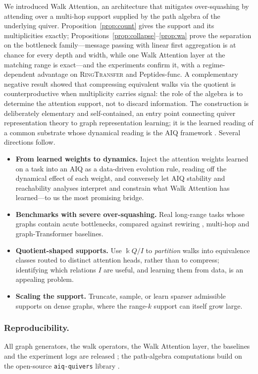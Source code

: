\documentclass[runningheads]{llncs}
\newcommand{\kk}{\Bbbk}
\newcommand{\kQ}{\kk Q}
\begin{document}
We introduced Walk Attention, an architecture that mitigates over-squashing by
attending over a multi-hop support supplied by the path algebra of the
underlying quiver. Proposition~\ref{prop:count} gives the support and its
multiplicities exactly; Propositions~\ref{prop:collapse}--\ref{prop:wa} prove
the separation on the bottleneck family---message passing with linear first
aggregation is at chance for every depth and width, while one Walk Attention
layer at the matching range is exact---and the experiments confirm it, with a
regime-dependent advantage on \textsc{RingTransfer} and Peptides-func. A
complementary negative result showed that compressing equivalent walks via the
quotient is counterproductive when multiplicity carries signal: the role of the
algebra is to determine the attention support, not to discard information. The
construction is deliberately elementary and self-contained, an entry point
connecting quiver representation theory to graph representation learning; it
is the learned reading of a common substrate whose dynamical reading is the
AIQ framework \cite{zainea2026aiq}. Several directions follow.

\begin{itemize}
  \item \textbf{From learned weights to dynamics.} Inject the attention weights
  learned on a task into an AIQ as a data-driven evolution rule, reading off
  the dynamical effect of each weight, and conversely let AIQ stability and
  reachability analyses interpret and constrain what Walk Attention has
  learned---to us the most promising bridge.
  \item \textbf{Benchmarks with severe over-squashing.} Real long-range tasks
  whose graphs contain acute bottlenecks, compared against rewiring
  \cite{topping2022understanding}, multi-hop \cite{gutteridge2023drew} and
  graph-Transformer baselines.
  \item \textbf{Quotient-shaped supports.} Use $\kQ/I$ to \emph{partition}
  walks into equivalence classes routed to distinct attention heads, rather
  than to compress; identifying which relations $I$ are useful, and learning
  them from data, is an appealing problem.
  \item \textbf{Scaling the support.} Truncate, sample, or learn sparser
  admissible supports on dense graphs, where the range-$k$ support can itself
  grow large.
\end{itemize}

\subsubsection*{Reproducibility.}
All graph generators, the walk operators, the Walk Attention layer, the
baselines and the experiment logs are released \cite{repo_walkattention}; the
path-algebra computations build on the open-source \texttt{aiq-quivers} library
\cite{repo_aiqquivers}.



\end{document}
